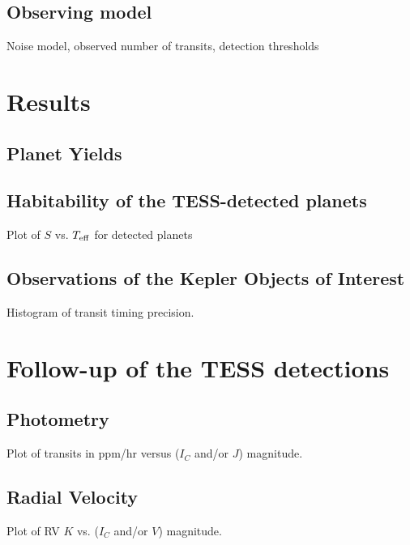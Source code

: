 \documentclass[preprint]{aastex}
\def \teff {T_{\rm eff}}
\begin{document}
\subsection{Observing model}
Noise model, observed number of transits, detection thresholds

\section{Results}
\subsection{Planet Yields}
\subsection{Habitability of the TESS-detected planets}
Plot of $S$ vs. $\teff$ for detected planets
\subsection{Observations of the Kepler Objects of Interest}
Histogram of transit timing precision.

\section{Follow-up of the TESS detections}
\subsection{Photometry}
Plot of transits in ppm/hr versus ($I_C$ and/or $J$) magnitude.
\subsection{Radial Velocity}
Plot of RV $K$ vs. ($I_C$ and/or $V$) magnitude.


\end{document}
